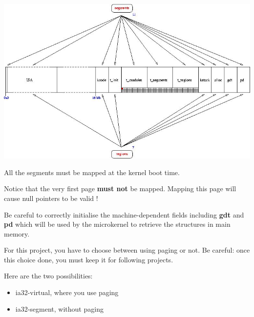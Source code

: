 \centerline{\includegraphics[scale=0.5]{figures/k1-memory-layout.jpg}}

All the segments must be mapped at the kernel boot time.

Notice that the  very first page \textbf{must not}  be mapped. Mapping
this page will cause null pointers to be valid !

Be careful to correctly initialise the machine-dependent fields
including \textbf{gdt} and \textbf{pd} which will be used by the microkernel
to retrieve the structures in main memory.

For this project,  you have to choose between using  paging or not. Be
careful:  once  this choice  done,  you  must  keep it  for  following
projects.

Here are the two possibilities:

\begin{itemize}
\item ia32-virtual, where you use paging
\item ia32-segment, without paging
\end{itemize}
